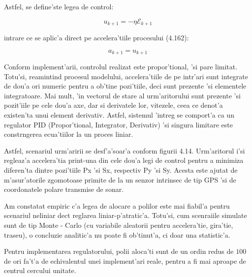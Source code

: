 \documentclass[12pt,a4paper,twoside]{report}
\begin{document}
\vspace{5px}

Astfel, se define'ste legea de control: 

\begin{equation}
    u_{k+1} = - \eta   \mathcal{E}_{k+1}
\end{equation}

intrare ce se aplic'a direct pe accelera'tiile procesului (4.162):

\begin{equation}
    a_{k+1} = u_{k+1}
\end{equation}

Conform implement'arii, controlul realizat este propor'tional, 'si pare limitat. Totu'si, reamintind procesul modelului, accelera'tiile de pe intr'ari sunt integrate de dou'a ori numeric pentru a ob'tine pozi'tiile, deci sunt prezente 'si elementele integratoare. Mai mult, 'in vectorul de stare al urm'aritorului sunt prezente 'si pozit'iile pe cele dou'a axe, dar si derivatele lor, vitezele, ceea ce denot'a existen'ta unui element derivativ. Astfel, sistemul 'intreg se comport'a ca un regulator PID (Propor'tional, Integrator, Derivativ) 'si singura limitare este constr\ia ngerea ecua'tiilor la un proces liniar. 

\vspace{5px}

Astfel, scenariul urm'aririi se desf'a'soar'a conform figurii 4.14. Urm'aritorul i'si regleaz'a accelera'tia print-una din cele dou'a legi de control pentru a minimiza diferen'ta dintre pozi'tiile Px 'si Sx, respectiv Py 'si Sy. Acesta este ajutat de m'asur'atorile zgomotoase primite de la un senzor intrinsec de tip GPS 'si de coordonatele polare transmise de sonar. 

\vspace{5px}

Am constatat empiric c'a legea de alocare a polilor este mai fiabil'a pentru scenariul neliniar dec\ia t reglarea liniar-p'atratic'a. Totu'si, cum scenraiile simulate sunt de tip Monte - Carlo (cu variabile aleatorii pentru accelera'tie, gira'tie, traseu), o concluzie analitic'a nu poate fi ob'tinut'a, ci doar una statistic'a.

\vspace{5px}

Pentru implementarea regulatorului, polii aloca'ti sunt de un ordin redus de $100$ de ori fa't'a de echivalentul unei implement'ari reale, pentru a fi mai aproape de centrul cercului unitate. 
\end{document}
